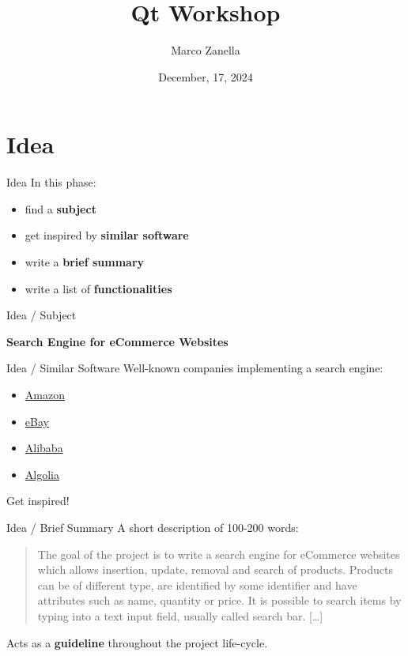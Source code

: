 \documentclass[11pt]{beamer}
\author{Marco Zanella}
\title{Qt Workshop}
\institute{University of Padova}
\date{December, 17, 2024}
\renewcommand{\emph}[1]{\textbf{#1}}
\begin{document}
\begin{frame}
 \titlepage
\end{frame}

\begin{frame}
 \tableofcontents
\end{frame}


\section{Idea}
\begin{frame}{Idea}
 In this phase:
 \begin{itemize}
  \item find a \emph{subject}
  \item get inspired by \emph{similar software}
  \item write a \emph{brief summary}
  \item write a list of \emph{functionalities}
 \end{itemize}
\end{frame}


\begin{frame}{Idea / Subject}
 \begin{center}
  \emph{Search Engine for eCommerce Websites}
 \end{center}
\end{frame}


\begin{frame}{Idea / Similar Software}
 Well-known companies implementing a search engine:
 \begin{itemize}
   \item \href{https://www.amazon.com}{Amazon}
   \item \href{https://www.ebay.com}{eBay}
   \item \href{https://www.alibaba.com}{Alibaba}
   \item \href{https://www.algolia.com}{Algolia}
 \end{itemize}
 Get inspired!
\end{frame}


\begin{frame}{Idea / Brief Summary}
 A short description of 100-200 words:
 
 \begin{quote}
  The goal of the project is to write a search engine for eCommerce websites which allows insertion, update, removal and search of products. Products can be of different type, are identified by some identifier and have attributes such as name, quantity or price. It is possible to search items by typing into a text input field, usually called search bar. [\ldots]
 \end{quote}
 
 Acts as a \emph{guideline} throughout the project life-cycle.
\end{frame}
\end{document}
